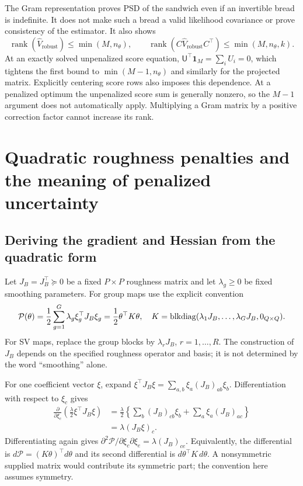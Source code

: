 The Gram representation proves PSD of the sandwich even if an
invertible bread is indefinite.  It does not make such a bread a valid
likelihood covariance or prove consistency of the estimator.  It also
shows
\[
 \operatorname{rank}(\widehat V_{\mathrm{robust}})
 \leq\min(M,n_\theta),\qquad
 \operatorname{rank}(C\widehat V_{\mathrm{robust}}C^\top)
 \leq\min(M,n_\theta,k).
\]
At an exactly solved unpenalized score equation,
$\mathsf U^\top\mathbf1_M=\sum_iU_i=0$, which tightens the first
bound to $\min(M-1,n_\theta)$ and similarly for the projected matrix.
Explicitly centering score rows also imposes this dependence.
At a penalized optimum the unpenalized score sum is generally nonzero,
so the $M-1$ argument does not automatically apply.  Multiplying a
Gram matrix by a positive correction factor cannot increase its rank.

\section{Quadratic roughness penalties and the meaning of penalized uncertainty}
\label{cov-penalties}

\subsection{Deriving the gradient and Hessian from the quadratic form}
\label{cov-penalty-derivatives}

Let $J_B=J_B^\top\succeq0$ be a fixed $P\times P$ roughness matrix
and let $\lambda_g\geq0$ be fixed smoothing parameters.  For group maps
use the explicit convention
\begin{equation}
 \mathcal P(\theta)=\frac12\sum_{g=1}^G
                         \lambda_g\xi_g^\top J_B\xi_g
                   =\frac12\theta^\top K\theta,\quad
 K=\operatorname{blkdiag}(\lambda_1J_B,\ldots,\lambda_GJ_B,0_{Q\times Q}).
 \label{cov-penalty-definition}
\end{equation}
For SV maps, replace the group blocks by
$\lambda_rJ_B$, $r=1,\ldots,R$.  The construction of $J_B$ depends
on the specified roughness operator and basis; it is not determined by
the word ``smoothing'' alone.

For one coefficient vector $\xi$, expand
$\xi^\top J_B\xi=\sum_{a,b}\xi_a(J_B)_{ab}\xi_b$.
Differentiation with respect to $\xi_c$ gives
\begin{align}
 \frac{\partial}{\partial\xi_c}
       \left(\frac{\lambda}{2}\xi^\top J_B\xi\right)
 &=\frac{\lambda}{2}
       \left\{\sum_b(J_B)_{cb}\xi_b+\sum_a\xi_a(J_B)_{ac}\right\}\\
 &=\lambda(J_B\xi)_c .
\end{align}
Differentiating again gives
$\partial^2\mathcal P/\partial\xi_c\partial\xi_e
=\lambda(J_B)_{ce}$.  Equivalently, the differential is
$d\mathcal P=(K\theta)^\top d\theta$ and its second differential
is $d\theta^\top K\,d\theta$.  A nonsymmetric supplied matrix would
contribute its symmetric part; the convention here assumes symmetry.

